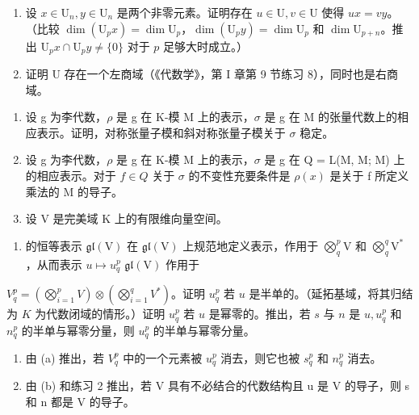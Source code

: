 \begin{enumerate}
\def\labelenumi{(\alph{enumi})}
\item
  设 \(x \in \mathrm{U}_n, y \in \mathrm{U}_n\) 是两个非零元素。证明存在 \(u \in \mathrm{U}, v \in \mathrm{U}\) 使得 \(ux = vy\)。（比较 \(\dim(\mathrm{U}_p x) = \dim \mathrm{U}_p\)，\(\dim(\mathrm{U}_p y) = \dim \mathrm{U}_p\) 和 \(\dim \mathrm{U}_{p+n}\)。推出 \(\mathrm{U}_p x \cap \mathrm{U}_p y \neq \{0\}\) 对于 \(p\) 足够大时成立。）
\item
  证明 U 存在一个左商域（《代数学》，第 I 章第 9 节练习 8），同时也是右商域。
\end{enumerate}


\begin{enumerate}
\def\labelenumi{\arabic{enumi}.}
\item
  设 g 为李代数，\(\rho\) 是 g 在 K-模 M 上的表示，\(\sigma\) 是 g 在 M 的张量代数上的相应表示。证明，对称张量子模和斜对称张量子模关于 \(\sigma\) 稳定。
\item
  设 g 为李代数，\(\rho\) 是 g 在 K-模 M 上的表示，\(\sigma\) 是 g 在 Q = L(M, M; M) 上的相应表示。对于 \(f \in Q\) 关于 \(\sigma\)  的不变性充要条件是 \(\rho(x)\) 是关于 f 所定义乘法的 M 的导子。
\item
  设 V 是完美域 K 上的有限维向量空间。
\end{enumerate}

\begin{enumerate}
\def\labelenumi{(\alph{enumi})}
\tightlist
\item
   的恒等表示 \(\mathfrak{gl}(\mathrm{V})\) 在 \(\mathfrak{gl}(\mathrm{V})\) 上规范地定义表示，作用于 \(\bigotimes_{q}^{p}\mathrm{V}\) 和 \(\bigotimes_{q}^{q}\mathrm{V}^{*}\)，从而表示 \(u\mapsto u_q^p\) \(\mathfrak{gl}(\mathrm{V})\) 作用于
\end{enumerate}

\(V_{q}^{p} = \left( \bigotimes_{i=1}^{p} V \right) \otimes \left( \bigotimes_{i=1}^{q} V^{*} \right)\)。证明 \(u_{q}^{p}\) 若 \(u\) 是半单的。（延拓基域，将其归结为 \(K\) 为代数闭域的情形。）证明 \(u_{q}^{p}\) 若 \(u\) 是幂零的。推出，若 \(s\) 与 \(n\) 是 \(u, u_{q}^{p}\) 和 \(n_{q}^{p}\) 的半单与幂零分量，则 \(u_{q}^{p}\) 的半单与幂零分量。

\begin{enumerate}
\def\labelenumi{(\alph{enumi})}
\setcounter{enumi}{1}
\item
  由 (a) 推出，若 \(V_q^p\) 中的一个元素被 \(u_q^p\)  消去，则它也被 \(s_q^p\) 和 \(n_q^p\) 消去。
\item
  由 (b) 和练习 2 推出，若 V 具有不必结合的代数结构且 u 是 V 的导子，则 s 和 n 都是 V 的导子。
\end{enumerate}

